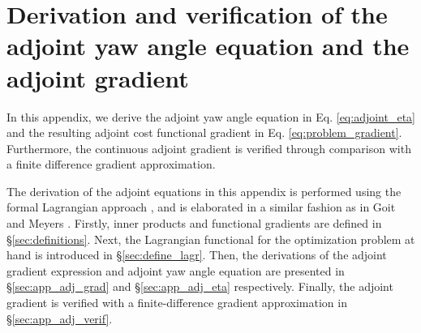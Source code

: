 \documentclass[energies,article,submit,moreauthors,latex,10pt,a4paper]{mdpi}
\begin{document}
\vspace{6pt} 





\appendix
\section{Derivation and verification of the adjoint yaw angle equation and the adjoint gradient}\label{sec:app_adj_der}

\noindent In this appendix, we derive the adjoint yaw angle equation in Eq. \ref{eq:adjoint_eta} and the resulting adjoint cost functional gradient in Eq. \ref{eq:problem_gradient}. Furthermore, the continuous adjoint gradient is verified through comparison with a finite difference gradient approximation. 

The derivation of the adjoint equations in this appendix is performed using the formal Lagrangian approach \cite{troltzsch, borzinschulz}, and is elaborated in a similar fashion as in Goit and Meyers \cite{goit2015optimal}. Firstly, inner products and functional gradients are defined in \S\ref{sec:definitions}. Next, the Lagrangian functional for the optimization problem at hand is introduced in \S\ref{sec:define_lagr}. Then, the derivations of the adjoint gradient expression and adjoint yaw angle equation are presented in \S\ref{sec:app_adj_grad} and \S\ref{sec:app_adj_eta} respectively. Finally, the adjoint gradient is verified with a finite-difference gradient approximation in \S\ref{sec:app_adj_verif}. 
\end{document}
